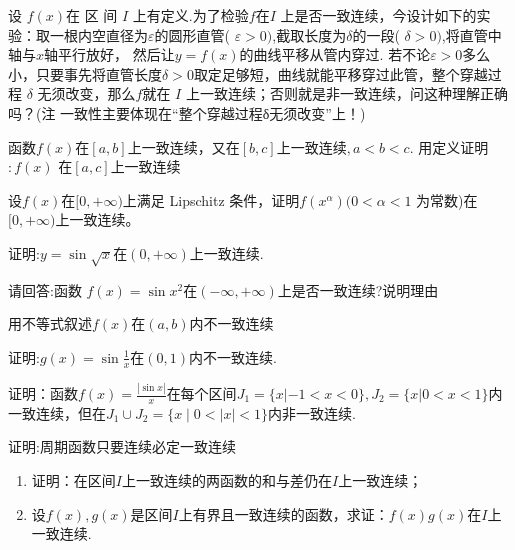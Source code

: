 \documentclass[lang=cn,newtx,10pt,scheme=chinese]{elegantbook}
\begin{document}
\begin{problem}
    设 $f( x) $在 区 间 $I$ 上有定义.为了检验$f$在$I$ 上是否一致连续，今设计如下的实验：取一根内空直径为$\varepsilon$的圆形直管( $\varepsilon>0)$,截取长度为$\delta$的一段( $\delta>0)$,将直管中轴与$x$轴平行放好， 然后让$y=f(x)$的曲线平移从管内穿过. 若不论$\varepsilon>0$多么小，只要事先将直管长度$\delta>0$取定足够短，曲线就能平移穿过此管，整个穿越过程 $\delta$ 无须改变，那么$f$就在 $I$ 上一致连续；否则就是非一致连续，问这种理解正确吗？(注 一致性主要体现在“整个穿越过程δ无须改变”上！)
\end{problem}


\begin{problem}
    函数$f(x)$在$[a,b]$上一致连续，又在$[b,c]$上一致连续$,a<b<c.$ 用定义证明$:f(x)$
在$[a,c]$上一致连续
\end{problem}

\begin{problem}
    设$f(x)$在$[0,+\infty)$上满足 Lipschitz 条件，证明$f(x^\alpha)(0<\alpha<1$ 为常数)在$[0,+\infty)$上一致连续。
\end{problem}

\begin{problem}
    证明:$y=\sin\sqrt{x}$在$(0,+\infty)$上一致连续.
\end{problem}

\begin{problem}
    请回答:函数 $f(x)=\sin x^2$在$(-\infty,+\infty)$上是否一致连续?说明理由
\end{problem}

\begin{problem}
    用不等式叙述$f(x)$在$(a,b)$内不一致连续
\end{problem}

\begin{problem}
    证明:$g(x)=\sin\frac{1}{x}$在$(0,1)$内不一致连续.
\end{problem}

\begin{problem}
    证明：函数$f(x)=\frac{|\sin x|}{x}$在每个区间$J_1=\{x|-1<x<0\},J_2=\{x|0<x<1\}$内一致连续，但在$J_1\cup J_2=\{x\mid0<\mid x\mid<1\}$内非一致连续.
\end{problem}

\begin{problem}
    证明:周期函数只要连续必定一致连续
\end{problem}

\begin{problem}
    \begin{enumerate}
        \item 证明：在区间$I$上一致连续的两函数的和与差仍在$I$上一致连续；
        \item 设$f(x),g(x)$是区间$I$上有界且一致连续的函数，求证：$f(x)g(x)$在$I$上一致连续.
    \end{enumerate}
\end{problem}
\end{document}
